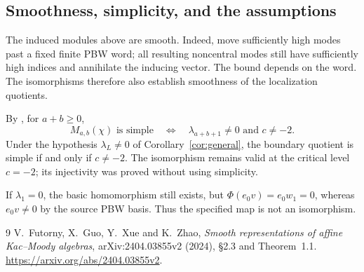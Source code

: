 \documentclass[11pt]{article}
\begin{document}
\subsection{Smoothness, simplicity, and the assumptions}

The induced modules above are smooth. Indeed, move sufficiently high modes
past a fixed finite PBW word; all resulting noncentral modes still have
sufficiently high indices and annihilate the inducing vector.
The bound depends on the word. The isomorphisms therefore also establish
smoothness of the localization quotients.

By \cite[Theorem~1.1]{FGXZ}, for \(a+b\ge0\),
\[
 M_{a,b}(\chi)\text{ is simple}\quad\Longleftrightarrow\quad
 \lambda_{a+b+1}\ne0\text{ and }c\ne-2.
\]
Under the hypothesis \(\lambda_L\ne0\) of Corollary~\ref{cor:general},
the boundary quotient is simple if and only if \(c\ne-2\).
The isomorphism remains valid at the critical level \(c=-2\);
its injectivity was proved without using simplicity.

If \(\lambda_1=0\), the basic homomorphism still exists, but
\(\Phi(e_0v)=e_0w_1=0\), whereas \(e_0v\ne0\) by the source PBW basis.
Thus the specified map is not an isomorphism.

\begin{thebibliography}{9}
V.~Futorny, X.~Guo, Y.~Xue and K.~Zhao,
\emph{Smooth representations of affine Kac--Moody algebras},
arXiv:2404.03855v2 (2024), \S2.3 and Theorem~1.1.
\url{https://arxiv.org/abs/2404.03855v2}.
\end{thebibliography}
\end{document}
